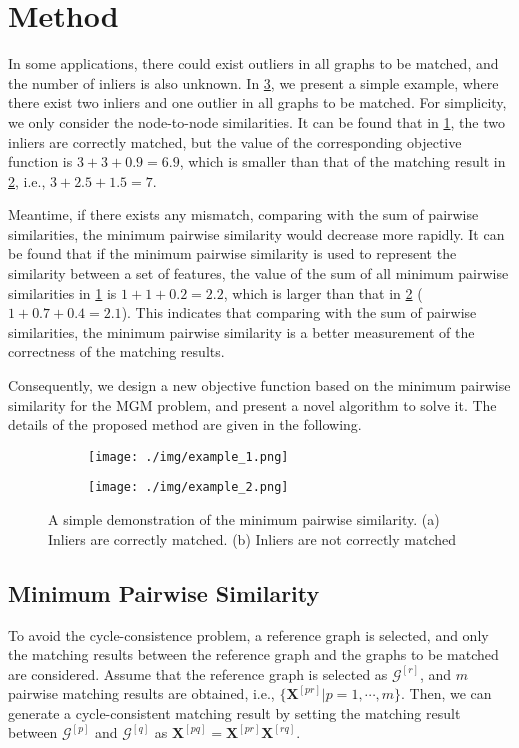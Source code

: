 \section{Method}
In some applications, there could exist outliers in all graphs to be matched, and the number of inliers is also unknown. In \cref{fig:4.0}, we present a simple example, where there exist two inliers and one outlier in all graphs to be matched. For simplicity, we only consider the node-to-node similarities. It can be found that in \cref{fig:4.0.1}, the two inliers are correctly matched, but the value of the corresponding objective function is $3+3+0.9=6.9$, which is smaller than that of the matching result in \cref{fig:4.0.2}, i.e., $3+2.5+1.5=7$. 

Meantime, if there exists any mismatch, comparing with the sum of pairwise similarities, the minimum pairwise similarity would decrease more rapidly. It can be found that if the minimum pairwise similarity is used to represent the similarity between a set of features, the value of the sum of all minimum pairwise similarities in \cref{fig:4.0.1} is $1+1+0.2=2.2$, which is larger than that in \cref{fig:4.0.2} ($1+0.7+0.4 = 2.1$). This indicates that comparing with the sum of pairwise similarities, the minimum pairwise similarity is a better measurement of the correctness of the matching results.

Consequently, we design a new objective function based on the minimum pairwise similarity for the MGM problem, and present a novel algorithm to solve it. The details of the proposed method are given in the following. 

\begin{figure}[htbp!]
    \centering
    \begin{subfigure}{.3\textwidth}
        \centering
        \texttt{[image: ./img/example\_1.png]}
        \caption{}
        \label{fig:4.0.1}
    \end{subfigure}
    \quad \quad
    \begin{subfigure}{.3\textwidth}
        \centering
        \texttt{[image: ./img/example\_2.png]}
        \caption{}
        \label{fig:4.0.2}
    \end{subfigure}
    \caption{A simple demonstration of the minimum pairwise similarity. (a) Inliers are correctly matched. (b) Inliers are not correctly matched}
    \label{fig:4.0}
\end{figure}

\subsection{Minimum Pairwise Similarity}
To avoid the cycle-consistence problem, a reference graph is selected, and only the matching results between the reference graph and the graphs to be matched are considered. Assume that the reference graph is selected as $\mathcal G^{[r]}$, and $m$ pairwise matching results are obtained, i.e., $\{\mathbf X^{[pr]}|p= 1, \cdots, m\}$. Then, we can generate a cycle-consistent matching result by setting the matching result between $\mathcal G^{[p]}$ and $\mathcal G^{[q]}$ as $\mathbf X^{[pq]} = \mathbf X^{[pr]} \mathbf X^{[rq]}$.

